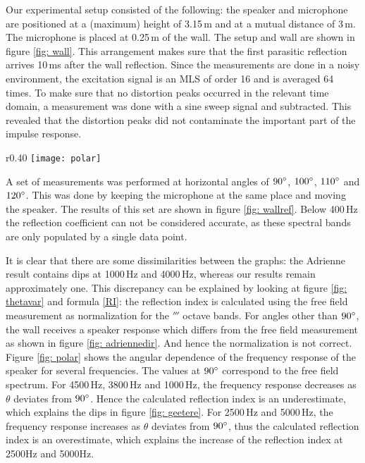 Our experimental setup consisted of the following: the speaker and microphone are positioned at a (maximum) height of 3.15\,m and at a mutual distance of 3\,m. The microphone is placed at 0.25\,m of the wall. The setup and wall are shown in figure \ref{fig: wall}. This arrangement makes sure that the first parasitic reflection arrives 10\,ms after the wall reflection. Since the measurements are done in a noisy environment, the excitation signal is an MLS of order 16 and is averaged 64 times. To make sure that no distortion peaks occurred in the relevant time domain, a measurement was done with a sine sweep signal and subtracted. This revealed that the distortion peaks did not contaminate the important part of the impulse response. 

\begin{wrapfigure}{r}{0.40\textwidth}
	\vspace{-10pt}
  \centering
    \texttt{[image: polar]}
  \caption{Angular dependence of the frequency response of the speaker for certain frequencies.}
  \label{fig: polar}
\end{wrapfigure}
A set of measurements was performed at horizontal angles of $90^{\circ}$, $100^{\circ}$, $110^{\circ}$ and $120^{\circ}$. This was done by keeping the microphone at the same place and moving the speaker. The results of this set are shown in figure \ref{fig: wallref}. Below 400\,Hz the reflection coefficient can not be considered accurate, as these spectral bands are only populated by a single data point.

It is clear that there are some dissimilarities between the graphs: the Adrienne result contains dips at 1000\,Hz and 4000\,Hz, whereas our results remain approximately one. This discrepancy can be explained by looking at figure \ref{fig: thetavar} and formula \ref{RI}: the reflection index is calculated using the free field measurement as normalization for the $\third$ octave bands. For angles other than $90^{\circ}$, the wall receives a  speaker response which differs from the free field measurement as shown in figure \ref{fig: adriennedir}. And hence the normalization is not correct. Figure \ref{fig: polar} shows the angular dependence of the frequency response of the speaker for several frequencies. The values at $90^{\circ}$ correspond to the free field spectrum. For 4500\,Hz, 3800\,Hz and 1000\,Hz, the frequency response decreases as $\theta$ deviates from $90^{\circ}$. Hence the calculated reflection index is an underestimate, which explains the dips in figure \ref{fig: geetere}. For 2500\,Hz and 5000\,Hz, the frequency response increases as $\theta$ deviates from $90^{\circ}$, thus the calculated reflection index is an overestimate, which explains the increase of the reflection index at 2500Hz and 5000Hz. 


